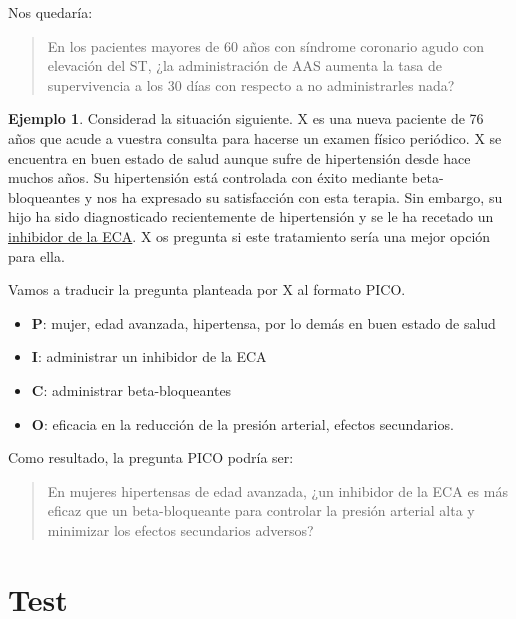\documentclass[
]{book}
\providecommand{\tightlist}{%
  \setlength{\itemsep}{0pt}\setlength{\parskip}{0pt}}
\theoremstyle{definition}
\theoremstyle{definition}
\newtheorem{example}{Ejemplo}[chapter]
\theoremstyle{definition}
\theoremstyle{definition}
\theoremstyle{remark}
\begin{document}
Nos quedaría:

\begin{quote}
En los pacientes mayores de 60 años con síndrome coronario agudo con elevación del ST, ¿la administración de AAS aumenta la tasa de supervivencia a los 30 días con respecto a no administrarles nada?
\end{quote}

\begin{example}
\protect\hypertarget{exm:unnamed-chunk-56}{}\label{exm:unnamed-chunk-56}Considerad la situación siguiente. X es una nueva paciente de 76 años que acude a vuestra consulta para hacerse un examen físico periódico. X se encuentra en buen estado de salud aunque sufre de hipertensión desde hace muchos años. Su hipertensión está controlada con éxito mediante beta-bloqueantes y nos ha expresado su satisfacción con esta terapia. Sin embargo, su hijo ha sido diagnosticado recientemente de hipertensión y se le ha recetado un \href{https://es.wikipedia.org/wiki/Inhibidor_de_la_enzima_convertidora_de_angiotensina}{inhibidor de la ECA}. X os pregunta si este tratamiento sería una mejor opción para ella.

Vamos a traducir la pregunta planteada por X al formato PICO.
\end{example}

\begin{itemize}
\tightlist
\item
  \textbf{P}: mujer, edad avanzada, hipertensa, por lo demás en buen estado de salud
\item
  \textbf{I}: administrar un inhibidor de la ECA
\item
  \textbf{C}: administrar beta-bloqueantes
\item
  \textbf{O}: eficacia en la reducción de la presión arterial, efectos secundarios.
\end{itemize}

Como resultado, la pregunta PICO podría ser:

\begin{quote}
En mujeres hipertensas de edad avanzada, ¿un inhibidor de la ECA es más eficaz que un beta-bloqueante para controlar la presión arterial alta y minimizar los efectos secundarios adversos?
\end{quote}

\hypertarget{test}{%
\section{Test}\label{test}}
\end{document}
